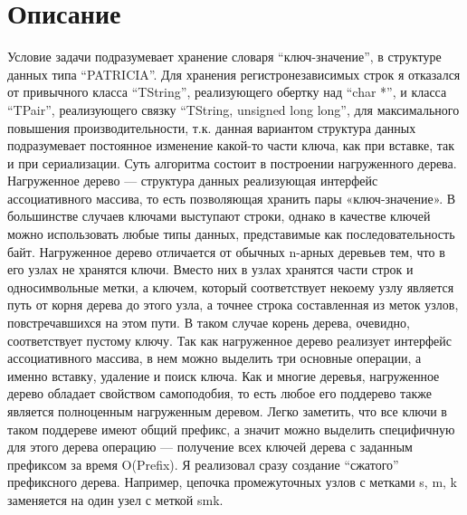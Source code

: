 \documentclass[pdf, unicode, 12pt, a4paper,oneside,fleqn]{article}
\begin{document}
\section{Описание}
Условие задачи подразумевает хранение словаря \enquote{ключ-значение}, в структуре данных типа \enquote{PATRICIA}. Для хранения регистронезависимых строк я отказался от привычного класса \enquote{TString}, реализующего обертку над \enquote{char *}, и класса \enquote{TPair}, реализующего связку \enquote{TString, unsigned long long}, для максимального повышения производительности, т.к. данная вариантом структура данных подразумевает постоянное изменение какой-то части ключа, как при вставке, так и при сериализации.\newline
Суть алгоритма состоит в построении нагруженного дерева. Нагруженное дерево — структура данных реализующая интерфейс ассоциативного массива, то есть позволяющая хранить пары «ключ-значение». В большинстве случаев ключами выступают строки, однако в качестве ключей можно использовать любые типы данных, представимые как последовательность байт.\newline
Нагруженное дерево отличается от обычных n-арных деревьев тем, что в его узлах не хранятся ключи. Вместо них в узлах хранятся части строк и односимвольные метки, а ключем, который соответствует некоему узлу является путь от корня дерева до этого узла, а точнее строка составленная из меток узлов, повстречавшихся на этом пути. В таком случае корень дерева, очевидно, соответствует пустому ключу.\newline
Так как нагруженное дерево реализует интерфейс ассоциативного массива, в нем можно выделить три основные операции, а именно вставку, удаление и поиск ключа. Как и многие деревья, нагруженное дерево обладает свойством самоподобия, то есть любое его поддерево также является полноценным нагруженным деревом. Легко заметить, что все ключи в таком поддереве имеют общий префикс, а значит можно выделить специфичную для этого дерева операцию — получение всех ключей дерева с заданным префиксом за время O(Prefix).\newline
Я реализовал сразу создание \enquote{сжатого}  префиксного дерева. Например, цепочка промежуточных узлов с метками s, m, k заменяется на один узел с меткой smk.
\pagebreak
\end{document}
